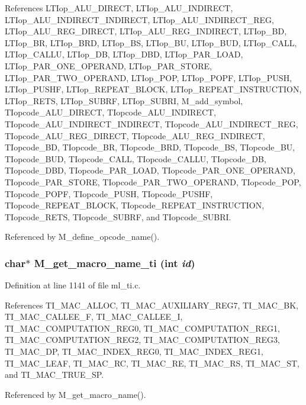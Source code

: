 References LTIop\_\-ALU\_\-DIRECT, LTIop\_\-ALU\_\-INDIRECT, LTIop\_\-ALU\_\-INDIRECT\_\-INDIRECT, LTIop\_\-ALU\_\-INDIRECT\_\-REG, LTIop\_\-ALU\_\-REG\_\-DIRECT, LTIop\_\-ALU\_\-REG\_\-INDIRECT, LTIop\_\-BD, LTIop\_\-BR, LTIop\_\-BRD, LTIop\_\-BS, LTIop\_\-BU, LTIop\_\-BUD, LTIop\_\-CALL, LTIop\_\-CALLU, LTIop\_\-DB, LTIop\_\-DBD, LTIop\_\-PAR\_\-LOAD, LTIop\_\-PAR\_\-ONE\_\-OPERAND, LTIop\_\-PAR\_\-STORE, LTIop\_\-PAR\_\-TWO\_\-OPERAND, LTIop\_\-POP, LTIop\_\-POPF, LTIop\_\-PUSH, LTIop\_\-PUSHF, LTIop\_\-REPEAT\_\-BLOCK, LTIop\_\-REPEAT\_\-INSTRUCTION, LTIop\_\-RETS, LTIop\_\-SUBRF, LTIop\_\-SUBRI, M\_\-add\_\-symbol, TIopcode\_\-ALU\_\-DIRECT, TIopcode\_\-ALU\_\-INDIRECT, TIopcode\_\-ALU\_\-INDIRECT\_\-INDIRECT, TIopcode\_\-ALU\_\-INDIRECT\_\-REG, TIopcode\_\-ALU\_\-REG\_\-DIRECT, TIopcode\_\-ALU\_\-REG\_\-INDIRECT, TIopcode\_\-BD, TIopcode\_\-BR, TIopcode\_\-BRD, TIopcode\_\-BS, TIopcode\_\-BU, TIopcode\_\-BUD, TIopcode\_\-CALL, TIopcode\_\-CALLU, TIopcode\_\-DB, TIopcode\_\-DBD, TIopcode\_\-PAR\_\-LOAD, TIopcode\_\-PAR\_\-ONE\_\-OPERAND, TIopcode\_\-PAR\_\-STORE, TIopcode\_\-PAR\_\-TWO\_\-OPERAND, TIopcode\_\-POP, TIopcode\_\-POPF, TIopcode\_\-PUSH, TIopcode\_\-PUSHF, TIopcode\_\-REPEAT\_\-BLOCK, TIopcode\_\-REPEAT\_\-INSTRUCTION, TIopcode\_\-RETS, TIopcode\_\-SUBRF, and TIopcode\_\-SUBRI.

Referenced by M\_\-define\_\-opcode\_\-name().
\subsubsection{\setlength{\rightskip}{0pt plus 5cm}char$\ast$ M\_\-get\_\-macro\_\-name\_\-ti (int {\em id})}\label{ml__ti_8c_1253c117d601ea643a109dc732cc72a8}




Definition at line 1141 of file ml\_\-ti.c.

References TI\_\-MAC\_\-ALLOC, TI\_\-MAC\_\-AUXILIARY\_\-REG7, TI\_\-MAC\_\-BK, TI\_\-MAC\_\-CALLEE\_\-F, TI\_\-MAC\_\-CALLEE\_\-I, TI\_\-MAC\_\-COMPUTATION\_\-REG0, TI\_\-MAC\_\-COMPUTATION\_\-REG1, TI\_\-MAC\_\-COMPUTATION\_\-REG2, TI\_\-MAC\_\-COMPUTATION\_\-REG3, TI\_\-MAC\_\-DP, TI\_\-MAC\_\-INDEX\_\-REG0, TI\_\-MAC\_\-INDEX\_\-REG1, TI\_\-MAC\_\-LEAF, TI\_\-MAC\_\-RC, TI\_\-MAC\_\-RE, TI\_\-MAC\_\-RS, TI\_\-MAC\_\-ST, and TI\_\-MAC\_\-TRUE\_\-SP.

Referenced by M\_\-get\_\-macro\_\-name().
